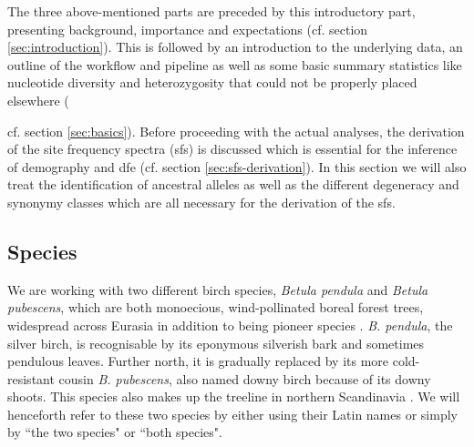 \documentclass[hidelinks,11pt]{article}
\newcommand{\pendula}{\textit{B. pendula}}
\newcommand{\pubescens}{\textit{B. pubescens}}
\begin{document}
    The three above-mentioned parts are preceded by this introductory part, presenting background, importance and expectations (cf. section \ref{sec:introduction}). This is followed by an introduction to the underlying data, an outline of the workflow and pipeline as well as some basic summary statistics like nucleotide diversity and heterozygosity that could not be properly placed elsewhere ({cf. section \ref{sec:basics}). Before proceeding with the actual analyses, the derivation of the site frequency spectra (\acrshort{sfs}) is discussed which is essential for the inference of demography and \acrshort{dfe} (cf. section \ref{sec:sfs-derivation}). In this section we will also treat the identification of ancestral alleles as well as the different degeneracy and synonymy classes which are all necessary for the derivation of the \acrshort{sfs}.

    \subsection{Species}
    \label{sec:species}

    We are working with two different birch species, \textit{Betula pendula} and \textit{Betula pubescens}, which are both monoecious, wind-pollinated boreal forest trees, widespread across Eurasia in addition to being pioneer species \cite{recolonisation-birch}. \pendula{}, the silver birch, is recognisable by its eponymous silverish bark and sometimes pendulous leaves. Further north, it is gradually replaced by its more cold-resistant cousin \pubescens{}, also named downy birch because of its downy shoots. This species also makes up the treeline in northern Scandinavia \cite{birch-climate-change-treeline}. We will henceforth refer to these two species by either using their Latin names or simply by ``the two species" or ``both species".

}
\end{document}
